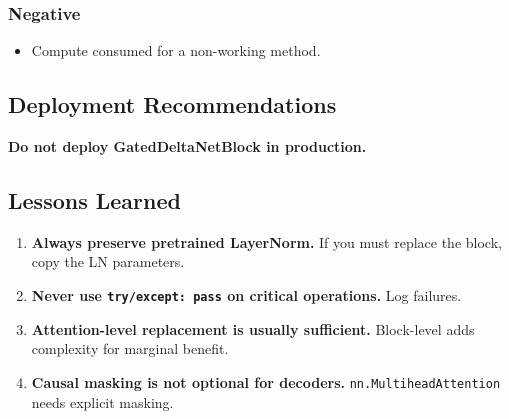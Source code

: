 \subsubsection{Negative}

\begin{itemize}
\item Compute consumed for a non-working method.

\end{itemize}
\subsection{Deployment Recommendations}

\textbf{Do not deploy GatedDeltaNetBlock in production.}

\subsection{Lessons Learned}

\begin{enumerate}
\item \textbf{Always preserve pretrained LayerNorm.} If you must replace the block,
  copy the LN parameters.
\item \textbf{Never use \texttt{try/except: pass} on critical operations.} Log failures.
\item \textbf{Attention-level replacement is usually sufficient.} Block-level adds
  complexity for marginal benefit.
\item \textbf{Causal masking is not optional for decoders.} \texttt{nn.MultiheadAttention}
  needs explicit masking.

\end{enumerate}
